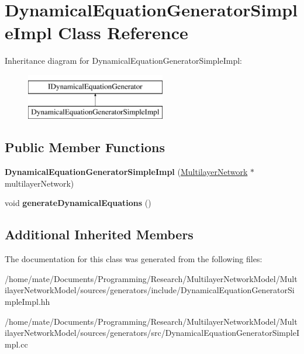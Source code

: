\hypertarget{classDynamicalEquationGeneratorSimpleImpl}{}\section{Dynamical\+Equation\+Generator\+Simple\+Impl Class Reference}
\label{classDynamicalEquationGeneratorSimpleImpl}
Inheritance diagram for Dynamical\+Equation\+Generator\+Simple\+Impl\+:\begin{figure}[H]
\begin{center}
\leavevmode
\includegraphics[height=2.000000cm]{classDynamicalEquationGeneratorSimpleImpl}
\end{center}
\end{figure}
\subsection*{Public Member Functions}
\begin{DoxyCompactItemize}
\item 
{\bfseries Dynamical\+Equation\+Generator\+Simple\+Impl} (\hyperlink{classMultilayerNetwork}{Multilayer\+Network} $\ast$multilayer\+Network)\hypertarget{classDynamicalEquationGeneratorSimpleImpl_aefe26119d2db680f1a03fc0b5415474e}{}\label{classDynamicalEquationGeneratorSimpleImpl_aefe26119d2db680f1a03fc0b5415474e}

\item 
void {\bfseries generate\+Dynamical\+Equations} ()\hypertarget{classDynamicalEquationGeneratorSimpleImpl_a92e9bade614a29d3c5351d89d43e98f1}{}\label{classDynamicalEquationGeneratorSimpleImpl_a92e9bade614a29d3c5351d89d43e98f1}

\end{DoxyCompactItemize}
\subsection*{Additional Inherited Members}


The documentation for this class was generated from the following files\+:\begin{DoxyCompactItemize}
\item 
/home/mate/\+Documents/\+Programming/\+Research/\+Multilayer\+Network\+Model/\+Multilayer\+Network\+Model/sources/generators/include/Dynamical\+Equation\+Generator\+Simple\+Impl.\+hh\item 
/home/mate/\+Documents/\+Programming/\+Research/\+Multilayer\+Network\+Model/\+Multilayer\+Network\+Model/sources/generators/src/Dynamical\+Equation\+Generator\+Simple\+Impl.\+cc\end{DoxyCompactItemize}
